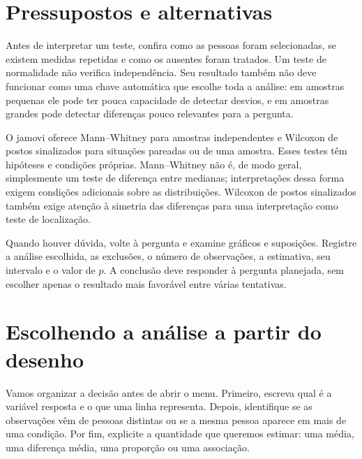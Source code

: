 \section{Pressupostos e alternativas}

Antes de interpretar um teste, confira como as pessoas foram selecionadas, se existem medidas repetidas e como os ausentes foram tratados. Um teste de normalidade não verifica independência. Seu resultado também não deve funcionar como uma chave automática que escolhe toda a análise: em amostras pequenas ele pode ter pouca capacidade de detectar desvios, e em amostras grandes pode detectar diferenças pouco relevantes para a pergunta.

O jamovi oferece Mann--Whitney para amostras independentes e Wilcoxon de postos sinalizados para situações pareadas ou de uma amostra. Esses testes têm hipóteses e condições próprias. Mann--Whitney não é, de modo geral, simplesmente um teste de diferença entre medianas; interpretações dessa forma exigem condições adicionais sobre as distribuições. Wilcoxon de postos sinalizados também exige atenção à simetria das diferenças para uma interpretação como teste de localização.

Quando houver dúvida, volte à pergunta e examine gráficos e suposições. Registre a análise escolhida, as exclusões, o número de observações, a estimativa, seu intervalo e o valor de $p$. A conclusão deve responder à pergunta planejada, sem escolher apenas o resultado mais favorável entre várias tentativas.

\section{Escolhendo a análise a partir do desenho}
\label{sec:escolha-teste}

Vamos organizar a decisão antes de abrir o menu. Primeiro, escreva qual é a variável resposta e o que uma linha representa. Depois, identifique se as observações vêm de pessoas distintas ou se a mesma pessoa aparece em mais de uma condição. Por fim, explicite a quantidade que queremos estimar: uma média, uma diferença média, uma proporção ou uma associação.

